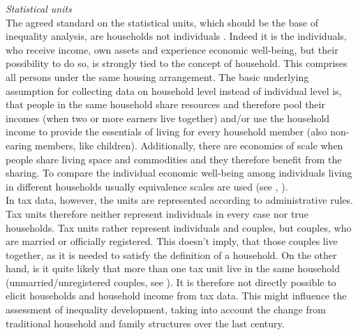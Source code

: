 \documentclass[twoside]{article}\usepackage[]{graphicx}\usepackage[]{color}
\begin{document}
\begin{multicols}{2}


\emph{Statistical units} \\

The agreed standard on the statistical units, which should be the base of inequality analysis, are households not individuals \citep[60]{oecd_oecd_2013}. Indeed it is the individuals, who receive income, own assets and experience economic well-being, but their possibility to do so, is strongly tied to the concept of household. This comprises all persons under the same housing arrangement. The basic underlying assumption for collecting data on household level instead of individual level is, that people in the same household share resources and therefore pool their incomes (when two or more earners live together) and/or use the household income to provide the essentials of living for every household member (also non-earing members, like children). Additionally, there are economies of scale when people share living space and commodities and they therefore benefit from the sharing. To compare the individual economic well-being among individuals living in different households usually equivalence scales are used (see \citealt[173]{oecd_oecd_2013}, \citealt{buhmann_equivalence_1988}). \\

In tax data, however, the units are represented according to administrative rules. Tax units therefore neither represent individuals in every case nor true households. Tax units rather represent individuals and couples, but couples, who are married or officially registered. This doesn't imply, that those couples live together, as it is needed to satisfy the definition of a household. On the other hand, is it quite likely that more than one tax unit live in the same household (unmarried/unregistered couples, see \citet[99]{muller_vermogenslage_2014}). It is therefore not directly possible to elicit households and household income from tax data. This might influence the assessment of inequality development, taking into account the change from traditional household and family structures over the last century. 




\end{multicols}
\end{document}
